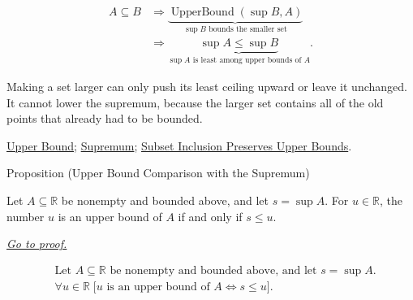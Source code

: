 \begin{remark*}
\[
\begin{aligned}
A\subseteq B
&\Longrightarrow
\underbrace{\operatorname{UpperBound}(\sup B,A)}_{\sup B\text{ bounds the smaller set}}\\
&\Longrightarrow
\underbrace{\sup A\le \sup B}_{\sup A\text{ is least among upper bounds of }A}.
\end{aligned}
\]
\end{remark*}

\begin{remark*}[Interpretation]
Making a set larger can only push its least ceiling upward or leave it unchanged. It cannot lower the supremum, because the larger set contains all of the old points that already had to be bounded.
\end{remark*}

\begin{remark*}[Dependencies]
\hyperref[def:upper-bound]{Upper Bound};
\hyperref[def:supremum]{Supremum};
\hyperref[lem:subset-inclusion-preserves-upper-bounds]{Subset Inclusion Preserves Upper Bounds}.
\end{remark*}


\begin{propositionbox}{Proposition (Upper Bound Comparison with the Supremum)}
\begin{proposition}
\label{prop:upper-bound-comparison-with-the-supremum}
Let $A\subseteq\mathbb{R}$ be nonempty and bounded above, and let $s=\sup A$. For $u\in\mathbb{R}$, the number $u$ is an upper bound of $A$ if and only if $s\le u$.

\smallskip
\noindent
\hyperref[prf:upper-bound-comparison-with-the-supremum]{\textit{Go to proof.}}
\end{proposition}
\end{propositionbox}

\begin{remark*}
\[
\begin{aligned}
&\text{Let }A\subseteq\mathbb{R}\text{ be nonempty and bounded above, and let }s=\sup A.\\
&\forall u\in\mathbb{R}\;
\bigl[u\text{ is an upper bound of }A
\Longleftrightarrow
s\le u\bigr].
\end{aligned}
\]
\end{remark*}

